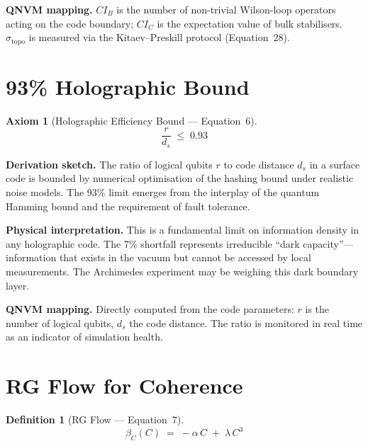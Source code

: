 \documentclass[11pt,a4paper]{article}
\newtheorem{axiom}{Axiom}
\newtheorem{definition}{Definition}[section]
\theoremstyle{remark}
\begin{document}
\textbf{QNVM mapping.}\quad
$CI_B$ is the number of non-trivial Wilson-loop operators acting on the code boundary; $CI_C$ is the expectation value of bulk stabilisers.  $\sigma_{\text{topo}}$ is measured via the Kitaev--Preskill protocol (Equation~28).

\section{93\% Holographic Bound}
\label{sec:eq6}

\begin{axiom}[Holographic Efficiency Bound --- Equation~6]
\begin{equation}\label{eq:93pct}
    \frac{r}{d_s} \;\leq\; 0.93
\end{equation}
\end{axiom}

\textbf{Derivation sketch.}\quad
The ratio of logical qubits $r$ to code distance $d_s$ in a surface code is bounded by numerical optimisation of the hashing bound under realistic noise models.  The 93\% limit emerges from the interplay of the quantum Hamming bound and the requirement of fault tolerance.

\textbf{Physical interpretation.}\quad
This is a fundamental limit on information density in any holographic code.  The 7\% shortfall represents irreducible ``dark capacity''---information that exists in the vacuum but cannot be accessed by local measurements.  The Archimedes experiment may be weighing this dark boundary layer.

\textbf{QNVM mapping.}\quad
Directly computed from the code parameters: $r$ is the number of logical qubits, $d_s$ the code distance.  The ratio is monitored in real time as an indicator of simulation health.

\section{RG Flow for Coherence}
\label{sec:eq7}

\begin{definition}[RG Flow --- Equation~7]
\begin{equation}\label{eq:rgflow}
    \beta_C(C) \;=\; -\alpha\, C \;+\; \lambda\, C^3
\end{equation}
\end{definition}
\end{document}
